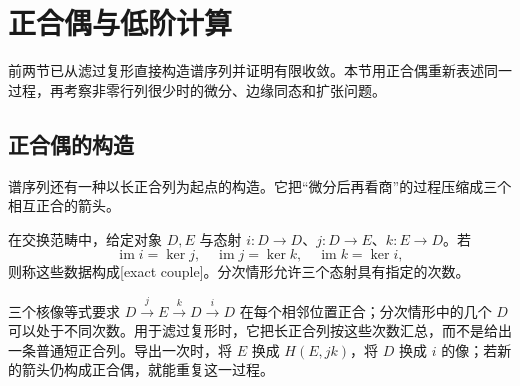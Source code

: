 
\section{正合偶与低阶计算}
\label{b4:sec:1404}

前两节已从滤过复形直接构造谱序列并证明有限收敛。本节用正合偶重新表述同一过程，再考察非零行列很少时的微分、边缘同态和扩张问题。

%
%

\subsection{正合偶的构造}
\label{b4:subsec:1404:01}

谱序列还有一种以长正合列为起点的构造。它把“微分后再看商”的过程压缩成三个相互正合的箭头。

\begin{definition}\label{b4:def:exact-couple}
	在交换范畴中，给定对象 \(D,E\) 与态射 \(i:D\to D\)、\(j:D\to E\)、\(k:E\to D\)。若
	\[
		\operatorname{im}i=\ker j,\quad \operatorname{im}j=\ker k,\quad \operatorname{im}k=\ker i,
	\]
	则称这些数据构成[exact couple]。分次情形允许三个态射具有指定的次数。
\end{definition}

三个核像等式要求 \(D\xrightarrow{j}E\xrightarrow{k}D\xrightarrow{i}D\) 在每个相邻位置正合；分次情形中的几个 \(D\) 可以处于不同次数。用于滤过复形时，它把长正合列按这些次数汇总，而不是给出一条普通短正合列。导出一次时，将 \(E\) 换成 \(H(E,jk)\)，将 \(D\) 换成 \(i\) 的像；若新的箭头仍构成正合偶，就能重复这一过程。

